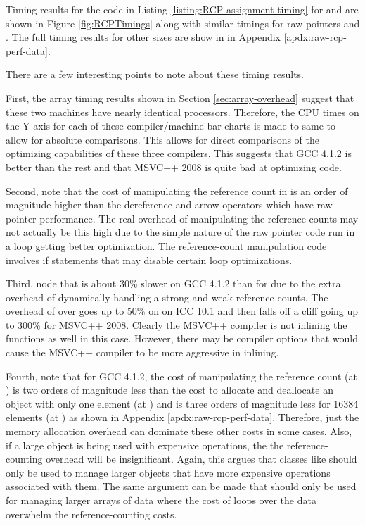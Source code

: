 \documentclass[pdf,ps2pdf,11pt]{SANDreport}
\begin{document}
Timing results for the code in Listing
{}\ref{listing:RCP-assignment-timing} for
{} and {} are
shown in Figure {}\ref{fig:RCPTimings} along with similar timings for
raw pointers and {}.  The full timing
results for other sizes are show in in Appendix
{}\ref{apdx:raw-rcp-perf-data}.

There are a few interesting points to note about these timing results.

First, the array timing results shown in Section
{}\ref{sec:array-overhead} suggest that these two machines have nearly
identical processors.  Therefore, the CPU times on the Y-axis for each
of these compiler/machine bar charts is made to same to allow for
absolute comparisons.  This allows for direct comparisons of the
optimizing capabilities of these three compilers.  This suggests that
GCC 4.1.2 is better than the rest and that MSVC++ 2008 is quite bad at
optimizing {} code.

Second, note that the cost of manipulating the reference count in
{} is an order of magnitude higher than
the dereference and arrow operators which have raw-pointer
performance.  The real overhead of manipulating the reference counts
may not actually be this high due to the simple nature of the raw
pointer code run in a loop getting better optimization.  The
reference-count manipulation code involves if statements that may
disable certain loop optimizations.

Third, node that {} is about 30\% slower
on GCC 4.1.2 than for {} due to the extra
overhead of dynamically handling a strong and weak reference counts.
The overhead of {} over {} goes
up to 50\% on on ICC 10.1 and then falls off a cliff going up to 300\%
for MSVC++ 2008.  Clearly the MSVC++ compiler is not inlining the
{} functions as well in this case.  However, there may be
compiler options that would cause the MSVC++ compiler to be more
aggressive in inlining.

Fourth, note that for GCC 4.1.2, the cost of manipulating the
reference count (at {}) is two orders of magnitude
less than the cost to allocate and deallocate an
{} object with only one element (at
{}) and is three orders of magnitude less for
16384 elements (at {}) as shown in Appendix
{}\ref{apdx:raw-rcp-perf-data}.  Therefore, just the memory allocation
overhead can dominate these other costs in some cases.  Also, if a
large object is being used with expensive operations, the the
reference-counting overhead will be insignificant.  Again, this argues
that classes like {} should only be used to manage larger
objects that have more expensive operations associated with them.  The
same argument can be made that {} should only be used
for managing larger arrays of data where the cost of loops over the
data overwhelm the reference-counting costs.
\end{document}
